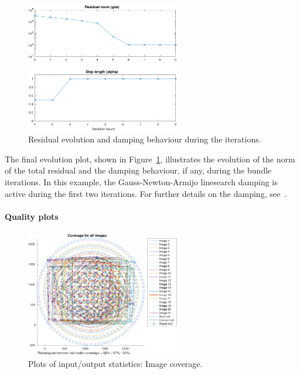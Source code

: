 \documentclass{article}
\begin{document}
\begin{figure}[tbp]
\centering
\includegraphics[width=0.6\textwidth]{./ill/ccamgnatrace.pdf}
\caption{\label{fig:gnatrace}
Residual evolution and damping behaviour during the iterations.}
\end{figure}

The final evolution plot, shown in Figure~\ref{fig:gnatrace},
illustrates the evolution of the norm of the total residual and the
damping behaviour, if any, during the bundle iterations. In this
example, the Gauss-Newton-Armijo linesearch damping is active during
the first two iterations. For further details on the damping,
see~\citet{Borlin2013:Bundle}.

\paragraph{Quality plots}
\label{sec:org58525f8}

\begin{figure}[tbp]
\centering
\includegraphics[width=0.6\textwidth]{./ill/ccamcoverage.pdf}
\caption{\label{fig:ccamCoverage}
Plots of input/output statistics: Image coverage.}
\end{figure}
\end{document}
